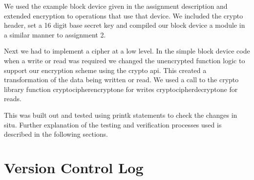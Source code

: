 \documentclass[onecolumn, draftclsnofoot,10pt, compsoc]{IEEEtran}
\begin{document}
We used the example block device given in the assignment description and extended encryption to operations that use that device. We included the crypto header, set a 16 digit base secret key and compiled our block device a module in a similar manner to assignment 2. 

Next we had to implement a cipher at a low level. In the simple block device code when a write or read was required we changed the unencrypted function logic to support our encryption scheme using the crypto api. This created a transformation of the data being written or read. We used a call to the crypto library function crypto\textunderscore cipher\textunderscore encrypt\textunderscore one for writes crypto\textunderscore cipher\textunderscore decrypt\textunderscore one for reads. 

This was built out and tested using printk statements to check the changes in situ. Further explanation of the testing and verification processes used is described in the following sections. 



\section{Version Control Log}

\end{document}
